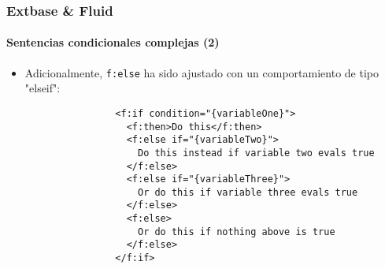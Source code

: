 
\begin{frame}[fragile]
	\frametitle{Extbase \& Fluid}
	\framesubtitle{Sentencias condicionales complejas (2)}

	\lstset{basicstyle=\tiny\ttfamily}

	\begin{itemize}

		\item Adicionalmente, \texttt{f:else} ha sido ajustado con un comportamiento de tipo "elseif":

			\begin{lstlisting}
				<f:if condition="{variableOne}">
				  <f:then>Do this</f:then>
				  <f:else if="{variableTwo}">
				    Do this instead if variable two evals true
				  </f:else>
				  <f:else if="{variableThree}">
				    Or do this if variable three evals true
				  </f:else>
				  <f:else>
				    Or do this if nothing above is true
				  </f:else>
				</f:if>
			\end{lstlisting}

	\end{itemize}

\end{frame}


